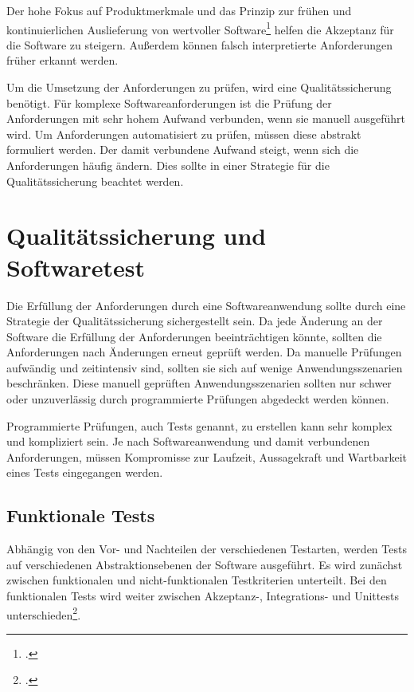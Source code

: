 Der hohe Fokus auf Produktmerkmale und das Prinzip zur frühen und kontinuierlichen Auslieferung von wertvoller Software\footcite[vgl.][]{agile-manifest-principles} helfen die Akzeptanz für die Software zu steigern. Außerdem können falsch interpretierte Anforderungen früher erkannt werden. 

Um die Umsetzung der Anforderungen zu prüfen, wird eine Qualitätssicherung benötigt. Für komplexe Softwareanforderungen ist die Prüfung der Anforderungen mit sehr hohem Aufwand verbunden, wenn sie manuell ausgeführt wird. Um Anforderungen automatisiert zu prüfen, müssen diese abstrakt formuliert werden. Der damit verbundene Aufwand steigt, wenn sich die Anforderungen häufig ändern. Dies sollte in einer Strategie für die Qualitätssicherung beachtet werden. 

\section{Qualitätssicherung und Softwaretest}

Die Erfüllung der Anforderungen durch eine Softwareanwendung sollte durch eine Strategie der Qualitätssicherung sichergestellt sein. Da jede Änderung an der Software die Erfüllung der Anforderungen beeinträchtigen könnte, sollten die Anforderungen nach Änderungen erneut geprüft werden. Da manuelle Prüfungen aufwändig und zeitintensiv sind, sollten sie sich auf wenige Anwendungsszenarien beschränken. Diese manuell geprüften Anwendungsszenarien sollten nur schwer oder unzuverlässig durch programmierte Prüfungen abgedeckt werden können.

Programmierte Prüfungen, auch Tests genannt, zu erstellen kann sehr komplex und kompliziert sein. Je nach Softwareanwendung und damit verbundenen Anforderungen, müssen Kompromisse zur Laufzeit, Aussagekraft und Wartbarkeit eines Tests eingegangen werden.

\subsection{Funktionale Tests}

Abhängig von den Vor- und Nachteilen der verschiedenen Testarten, werden Tests auf verschiedenen Abstraktionsebenen der Software ausgeführt. Es wird zunächst zwischen funktionalen und nicht-funktionalen Testkriterien unterteilt.
Bei den funktionalen Tests wird weiter zwischen Akzeptanz-, Integrations- und Unittests unterschieden\footcite[S.159][]{software-quality2008}. 

